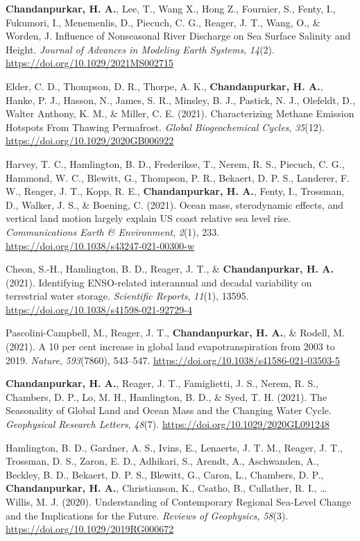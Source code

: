 \documentclass[10pt]{article}
\begin{document}
\label{csl:0}\textbf{Chandanpurkar, H. A.}, Lee, T., Wang X., Hong Z., Fournier, S., Fenty, I., Fukumori, I., Menemenlis, D., Piecuch, C. G., Reager, J. T., Wang, O., \& Worden, J. {Influence of Nonseasonal River Discharge on Sea Surface Salinity and Height}. \textit{Journal of Advances in Modeling Earth Systems}, \textit{14}(2). \url{https://doi.org/10.1029/2021MS002715}

\label{csl:0}Elder, C. D., Thompson, D. R., Thorpe, A. K., \textbf{Chandanpurkar, H. A.}, Hanke, P. J., Hasson, N., James, S. R., Minsley, B. J., Pastick, N. J., Olefeldt, D., Walter Anthony, K. M., \& Miller, C. E. (2021). {Characterizing Methane Emission Hotspots From Thawing Permafrost}. \textit{Global Biogeochemical Cycles}, \textit{35}(12). \url{https://doi.org/10.1029/2020GB006922}

\label{csl:0}Harvey, T. C., Hamlington, B. D., Frederikse, T., Nerem, R. S., Piecuch, C. G., Hammond, W. C., Blewitt, G., Thompson, P. R., Bekaert, D. P. S., Landerer, F. W., Reager, J. T., Kopp, R. E., \textbf{Chandanpurkar, H. A.}, Fenty, I., Trossman, D., Walker, J. S., \& Boening, C. (2021). {Ocean mass, sterodynamic effects, and vertical land motion largely explain US coast relative sea level rise}. \textit{Communications Earth \& Environment}, \textit{2}(1), 233. \url{https://doi.org/10.1038/s43247-021-00300-w}

\label{csl:0}Cheon, S.-H., Hamlington, B. D., Reager, J. T., \& \textbf{Chandanpurkar, H. A. }(2021). {Identifying ENSO-related interannual and decadal variability on terrestrial water storage}. \textit{Scientific Reports}, \textit{11}(1), 13595. \url{https://doi.org/10.1038/s41598-021-92729-4}

\label{csl:0}Pascolini-Campbell, M., Reager, J. T., \textbf{Chandanpurkar, H. A.}, \& Rodell, M. (2021). {A 10 per cent increase in global land evapotranspiration from 2003 to 2019}. \textit{Nature}, \textit{593}(7860), 543–547. \url{https://doi.org/10.1038/s41586-021-03503-5}

\label{csl:0}\textbf{Chandanpurkar, H. A.}, Reager, J. T., Famiglietti, J. S., Nerem, R. S., Chambers, D. P., Lo, M. H., Hamlington, B. D., \& Syed, T. H. (2021). {The Seasonality of Global Land and Ocean Mass and the Changing Water Cycle}. \textit{Geophysical Research Letters}, \textit{48}(7). \url{https://doi.org/10.1029/2020GL091248}

\label{csl:0}Hamlington, B. D., Gardner, A. S., Ivins, E., Lenaerts, J. T. M., Reager, J. T., Trossman, D. S., Zaron, E. D., Adhikari, S., Arendt, A., Aschwanden, A., Beckley, B. D., Bekaert, D. P. S., Blewitt, G., Caron, L., Chambers, D. P.,\textbf{ Chandanpurkar, H. A.}, Christianson, K., Csatho, B., Cullather, R. I., … Willis, M. J. (2020). {Understanding of Contemporary Regional Sea-Level Change and the Implications for the Future}. \textit{Reviews of Geophysics}, \textit{58}(3). \url{https://doi.org/10.1029/2019RG000672}
\end{document}
